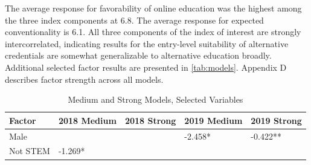 \documentclass[review]{elsarticle}
\begin{document}
        The average response for favorability of online education was the highest among the three
        index components at 6.8.
        The average response for expected conventionality is 6.1.
        All three components of the index of interest are strongly intercorrelated,
        indicating results for the entry-level suitability of alternative credentials
        are somewhat generalizable to alternative education broadly.
        Additional selected factor results are presented in \ref{tab:models}.
        Appendix D describes factor strength across all models.
        
        \begin{table}
            \caption{Medium and Strong Models, Selected Variables}
            \begin{tabular}{lllll}
            Factor & 2018 Medium & 2018 Strong & 2019 Medium & 2019 Strong \\
            \toprule
            Male &  &  & -2.458* & -0.422** \\
            Not STEM & -1.269* \\ %

\end{tabular}
\end{table}
\end{document}
